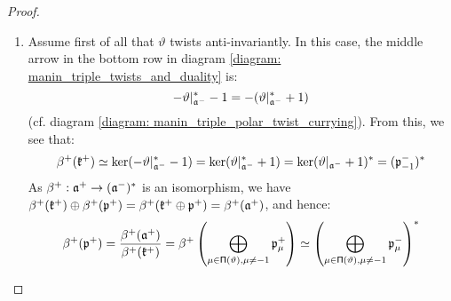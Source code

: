 \begin{proof}
                \begin{enumerate}
                    \item Assume first of all that $\vartheta$ twists anti-invariantly. In this case, the middle arrow in the bottom row in diagram \eqref{diagram: manin_triple_twists_and_duality} is:
                        $$-\vartheta|_{\mathfrak{a}^-}^* - 1 = -( \vartheta|_{\mathfrak{a}^-}^* + 1 )$$
                    (cf. diagram \eqref{diagram: manin_triple_polar_twist_currying}). From this, we see that:
                        $$\beta^+(\mathfrak{k}^+) \simeq \ker(-\vartheta|_{\mathfrak{a}^-}^* - 1) = \ker(\vartheta|_{\mathfrak{a}^-}^* + 1) = \ker(\vartheta|_{\mathfrak{a}^-} + 1)^* = (\mathfrak{p}_{-1}^-)^*$$
                    As $\beta^+: \mathfrak{a}^+ \to (\mathfrak{a}^-)^*$ is an isomorphism, we have $\beta^+(\mathfrak{k}^+) \oplus \beta^+(\mathfrak{p}^+) = \beta^+(\mathfrak{k}^+ \oplus \mathfrak{p}^+) = \beta^+(\mathfrak{a}^+)$, and hence:
                        $$\beta^+(\mathfrak{p}^+) = \frac{\beta^+(\mathfrak{a}^+)}{\beta^+(\mathfrak{k}^+)} = \beta^+\left( \bigoplus_{ \mu \in \mathsf{\Pi}(\vartheta), \mu \not = -1 } \mathfrak{p}_{\mu}^+ \right) \simeq \left( \bigoplus_{ \mu \in \mathsf{\Pi}(\vartheta), \mu \not = -1 } \mathfrak{p}_{\mu}^- \right)^*$$


\end{enumerate}
\end{proof}
